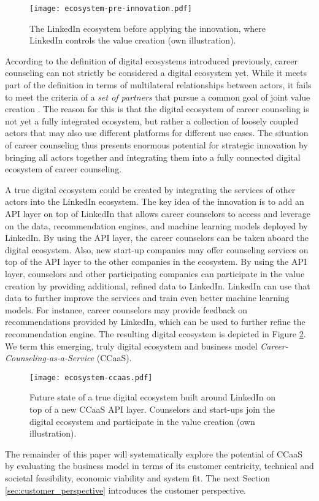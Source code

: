  \begin{figure}[hbt!]
    \centering
    \caption{The LinkedIn ecosystem before applying the innovation, where LinkedIn controls the value creation (own illustration).}
    \label{fig:ecosystem}
    \texttt{[image: ecosystem-pre-innovation.pdf]}
\end{figure}

According to the definition of digital ecosystems introduced previously, career counseling can not strictly be considered
a digital ecosystem yet. While it meets part of the definition in terms of multilateral relationships between actors, it
fails to meet the criteria of a \textit{set of partners} that pursue a common goal of joint value creation \citep{adnerEcosystemStructureActionable2017}.
The reason for this is that the digital ecosystem of career counseling is not yet a fully integrated ecosystem, but rather
a collection of loosely coupled actors that may also use different platforms for different use cases. The situation of 
career counseling thus presents enormous potential for strategic innovation by bringing all actors together and integrating
them into a fully connected digital ecosystem of career counseling.

A true digital ecosystem could be created by integrating the services of other actors into the LinkedIn ecosystem.
The key idea of the innovation is to add an API layer on top of LinkedIn that allows career counselors to access and leverage
on the data, recommendation engines, and machine learning models deployed by LinkedIn. By using the API layer, the career
counselors can be taken aboard the digital ecosystem. Also, new start-up companies may offer counseling services on top of 
the API layer to the other companies in the ecosystem. By using the API layer, counselors and other participating companies can
participate in the value creation by providing additional, refined data to LinkedIn. LinkedIn can use that data to further
improve the services and train even better machine learning models. For instance, career counselors may provide feedback
on recommendations provided by LinkedIn, which can be used to further refine the recommendation engine. The resulting digital
ecosystem is depicted in Figure \ref{fig:ecosystem-ccaas}. We term this emerging, truly digital ecosystem and business model
\textit{Career-Counseling-as-a-Service} (CCaaS).

\begin{figure}[h!]
    \centering
    \caption{Future state of a true digital ecosystem built around LinkedIn on top of a new CCaaS API layer. Counselors and
    start-ups join the digital ecosystem and participate in the value creation (own illustration).}
    \label{fig:ecosystem-ccaas}
    \texttt{[image: ecosystem-ccaas.pdf]}
\end{figure}

The remainder of this paper will systematically explore the potential of CCaaS by evaluating the business
model in terms of its customer centricity, technical and societal feasibility, economic viability and system fit. 
The next Section \ref{sec:customer_perspective} introduces the customer perspective.
